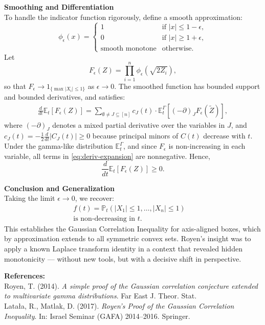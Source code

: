 \begin{technical}
\noindent\textbf{Smoothing and Differentiation}\\[0.5em]
To handle the indicator function rigorously, define a smooth approximation:
\[
\phi_\epsilon(x) = 
\begin{cases}
1 & \text{if } |x| \le 1 - \epsilon, \\
0 & \text{if } |x| \ge 1 + \epsilon, \\
\text{smooth monotone} & \text{otherwise}.
\end{cases}
\]
Let
\[
F_\epsilon(Z) = \prod_{i=1}^n \phi_\epsilon\left(\sqrt{2Z_i}\right),
\]
so that \( F_\epsilon \to 1_{\{\max |X_i| \le 1\}} \) as \( \epsilon \to 0 \). The smoothed function has bounded support and bounded derivatives, and satisfies:
\begin{align}
\frac{d}{dt} \mathbb{E}_t[F_\epsilon(Z)] 
= \sum_{\emptyset \neq J \subseteq [n]} c_J(t) \cdot \mathbb{E}^{\Gamma}_t \left[ (-\partial)_J F_\epsilon(\tilde Z) \right], \label{eq:deriv-expansion}
\end{align}
where \( (-\partial)_J \) denotes a mixed partial derivative over the variables in \( J \), and \( c_J(t) = -\frac{1}{2} \frac{d}{dt} |C_J(t)| \ge 0 \) because principal minors of \( C(t) \) decrease with \( t \). Under the gamma-like distribution \( \mathbb{E}^\Gamma_t \), and since \( F_\epsilon \) is non-increasing in each variable, all terms in \eqref{eq:deriv-expansion} are nonnegative. Hence,
\[
\frac{d}{dt} \mathbb{E}_t[F_\epsilon(Z)] \ge 0.
\]

\noindent\textbf{Conclusion and Generalization}\\[0.5em]
Taking the limit \( \epsilon \to 0 \), we recover:
\begin{align} 
f(t) = \mathbb{P}_t\left( |X_1| \le 1, \dots, |X_n| \le 1 \right) \quad \\\text{is non-decreasing in } t.
\end{align}
This establishes the Gaussian Correlation Inequality for axis-aligned boxes, which by approximation extends to all symmetric convex sets. Royen's insight was to apply a known Laplace transform identity in a context that revealed hidden monotonicity — without new tools, but with a decisive shift in perspective.

\vspace{0.5em}
\noindent\textbf{References:}\\
Royen, T. (2014). \textit{A simple proof of the Gaussian correlation conjecture extended to multivariate gamma distributions}. Far East J. Theor. Stat.\\
Latała, R., Matlak, D. (2017). \textit{Royen’s Proof of the Gaussian Correlation Inequality}. In: Israel Seminar (GAFA) 2014–2016. Springer.
\end{technical}
